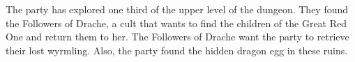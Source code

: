 The party has explored one third of the upper level of the dungeon.
They found the Followers of Drache, a cult that wants to find the children of the Great Red One and return them to her.
The Followers of Drache want the party to retrieve their lost wyrmling.
Also, the party found the hidden dragon egg in these ruins.
